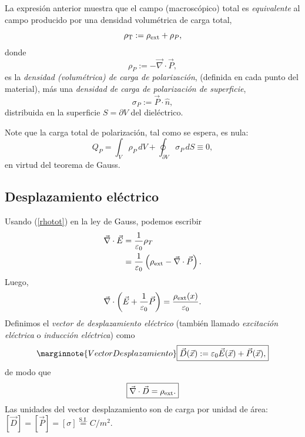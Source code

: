 La expresión anterior muestra que el campo (macroscópico) total es
\textit{equivalente} al campo producido por una densidad volumétrica de carga total,
\begin{equation}
\rho_{\rm T}:=\rho_{\rm ext}+\rho_P, \label{rhotot}
\end{equation}
donde
\begin{equation}
\boxed{\rho_P:=-\vec{\nabla}\cdot\vec{P},}
\end{equation}
es la \textit{densidad (volumétrica) de carga de polarización}, (definida en cada punto del material), más una
\textit{densidad de carga de polarización de superficie},
\begin{equation}
\boxed{\sigma_P:=\vec{P}\cdot\hat{n},}
\end{equation}
distribuida en la superficie $S=\partial V$ del dieléctrico.

Note que la carga total de polarización, tal como se espera, es nula:
\begin{equation}
 Q_P=\int_V\rho_P\,dV+\oint_{\partial V} \sigma_P\,dS\equiv 0,
\end{equation}
en virtud del teorema de Gauss.

\subsection{Desplazamiento eléctrico}
Usando (\ref{rhotot}) en la ley de Gauss, podemos escribir
\begin{align*}
\vec\nabla\cdot\vec{E} &=\frac{1}{\varepsilon_0}\rho_T \\
&=\frac{1}{\varepsilon_0}\left( \rho_{\rm ext}-\vec\nabla\cdot\vec{P}\right).
\end{align*}
Luego,
\begin{equation}
 \vec\nabla\cdot\left(\vec{E}+\frac{1}{\varepsilon_0}\vec{P}\right)=\frac{\rho_{
\rm ext}(x)}{\varepsilon_0}.
\end{equation}
Definimos el \textit{vector de desplazamiento eléctrico} (también llamado
\textit{excitación eléctrica} o \textit{inducción eléctrica}) como
\begin{equation}\marginnote{Vector Desplazamiento}
 \boxed{\vec{D}(\vec{x}):=\varepsilon_0\vec{E}(\vec{x})+\vec{P}(\vec{x}),} \label{defD}
\end{equation}
de modo que
\begin{equation}
\boxed{\vec{\nabla}\cdot\vec{D}=\rho_{\rm ext}.} \label{divD}
\end{equation}
Las unidades del vector desplazamiento son de carga por unidad de área: 
$[\vec{D}]=[\vec{P}]=[\sigma]\stackrel{\text{
S.I.}}{=}{C}/{m^2}$.

